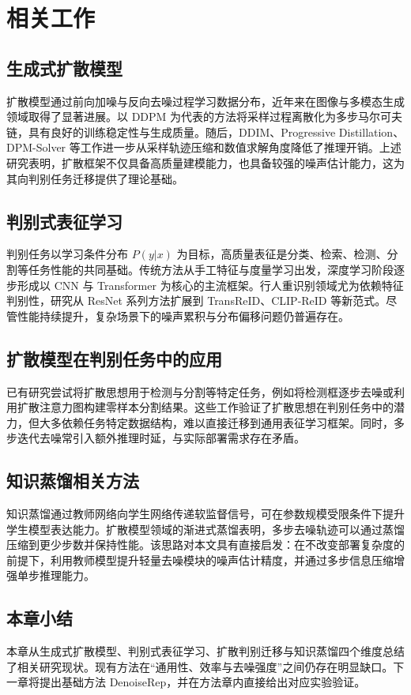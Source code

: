 ﻿\setlength{\baselineskip}{20pt}
\chapter{相关工作}
\label{cha:chap2}

\section{生成式扩散模型}
扩散模型通过前向加噪与反向去噪过程学习数据分布，近年来在图像与多模态生成领域取得了显著进展。以 DDPM 为代表的方法将采样过程离散化为多步马尔可夫链，具有良好的训练稳定性与生成质量。随后，DDIM、Progressive Distillation、DPM-Solver 等工作进一步从采样轨迹压缩和数值求解角度降低了推理开销。上述研究表明，扩散框架不仅具备高质量建模能力，也具备较强的噪声估计能力，这为其向判别任务迁移提供了理论基础。

\section{判别式表征学习}
判别任务以学习条件分布 $P(y|x)$ 为目标，高质量表征是分类、检索、检测、分割等任务性能的共同基础。传统方法从手工特征与度量学习出发，深度学习阶段逐步形成以 CNN 与 Transformer 为核心的主流框架。行人重识别领域尤为依赖特征判别性，研究从 ResNet 系列方法扩展到 TransReID、CLIP-ReID 等新范式。尽管性能持续提升，复杂场景下的噪声累积与分布偏移问题仍普遍存在。

\section{扩散模型在判别任务中的应用}
已有研究尝试将扩散思想用于检测与分割等特定任务，例如将检测框逐步去噪或利用扩散注意力图构建零样本分割结果。这些工作验证了扩散思想在判别任务中的潜力，但大多依赖任务特定数据结构，难以直接迁移到通用表征学习框架。同时，多步迭代去噪常引入额外推理时延，与实际部署需求存在矛盾。

\section{知识蒸馏相关方法}
知识蒸馏通过教师网络向学生网络传递软监督信号，可在参数规模受限条件下提升学生模型表达能力。扩散模型领域的渐进式蒸馏表明，多步去噪轨迹可以通过蒸馏压缩到更少步数并保持性能。该思路对本文具有直接启发：在不改变部署复杂度的前提下，利用教师模型提升轻量去噪模块的噪声估计精度，并通过多步信息压缩增强单步推理能力。

\section{本章小结}
本章从生成式扩散模型、判别式表征学习、扩散判别迁移与知识蒸馏四个维度总结了相关研究现状。现有方法在“通用性、效率与去噪强度”之间仍存在明显缺口。下一章将提出基础方法 DenoiseRep，并在方法章内直接给出对应实验验证。
